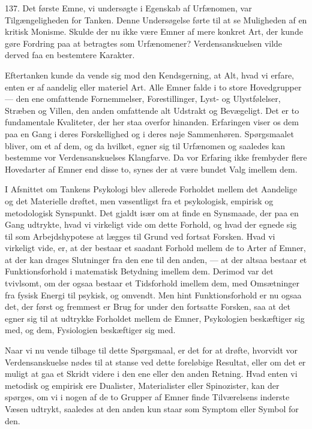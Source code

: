 \documentclass[12pt,a4paper]{book}
\newcommand{\apage}[1]{\marginnote{\footnotesize\textit{[#1]}}}
\begin{document}
137. Det første Emne, vi undersøgte i Egenskab af Urfænomen, var Tilgængeligheden for
Tanken. Denne Undersøgelse førte til at se Muligheden af en kritisk Monisme. Skulde der
nu ikke være Emner af mere konkret Art, der kunde gøre Fordring paa at betragtes som
Urfænomener? Verdensanskuelsen vilde derved faa en bestemtere Karakter.

Eftertanken kunde da vende sig mod den Kendsgerning, at Alt, hvad vi erfare, enten er af
aandelig eller materiel Art. Alle Emner falde i to store Hovedgrupper --- den ene
omfattende Fornemmelser, Forestillinger, Lyst- og Ulystfølelser, Stræben og Villen, den
anden omfattende alt Udstrakt og Bevægeligt. Det er to fundamentale Kvaliteter, der her
staa overfor hinanden. Erfaringen viser os dem paa en Gang i deres Forskellighed og i
deres nøje Sammenhøren. Spørgsmaalet bliver, om et af dem, og da hvilket, egner sig til
Urfænomen og saaledes kan bestemme vor Verdensanskuelses Klangfarve. Da vor Erfaring ikke
frembyder flere Hovedarter af Emner end disse to, synes der at være bundet Valg imellem
dem.

I Afsnittet om Tankens Psykologi blev allerede Forholdet mellem det Aandelige og det
Materielle drøftet, men væsentligst fra et psykologisk, empirisk og metodologisk
Synspunkt. Det gjaldt især om at finde en Synsmaade, der paa en Gang udtrykte, hvad vi virkeligt vide om dette Forhold, og hvad der egnede sig til som Arbejdshypotese at lægges
til Grund ved fortsat Forsken. Hvad vi virkeligt vide, er, at der bestaar et saadant
Forhold mellem de to Arter af Emner, at der kan drages Slutninger fra den ene til den
anden, --- at der altsaa bestaar et Funktionsforhold i matematisk Betydning imellem dem.
Derimod var det tvivlsomt, om der ogsaa bestaar et Tidsforhold imellem dem, med
Omsætninger fra fysisk Energi til psykisk, og omvendt. Men hint Funktionsforhold er nu
ogsaa det, der først og fremmest er Brug for under den fortsatte Forsken, saa at det egner
sig til at \apage{330} udtrykke Forholdet mellem de Emner, Psykologien beskæftiger sig med, og dem,
Fysiologien beskæftiger sig med.

Naar vi nu vende tilbage til dette Spørgsmaal, er det for at drøfte, hvorvidt vor
Verdensanskuelse nødes til at stanse ved dette foreløbige Resultat, eller om det er muligt
at gaa et Skridt videre i den ene eller den anden Retning. Hvad enten vi metodisk og
empirisk ere Dualister, Materialister eller Spinozister, kan der spørges, om vi i nogen af
de to Grupper af Emner finde Tilværelsens inderste Væsen udtrykt, saaledes at den anden
kun staar som Symptom eller Symbol for den.
\end{document}
